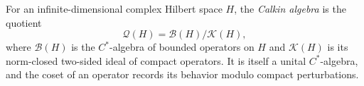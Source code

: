 
For an infinite-dimensional complex Hilbert space $H$, the \emph{Calkin algebra} is the quotient
\[
\mathcal Q(H)=\mathcal B(H)/\mathcal K(H),
\]
where $\mathcal B(H)$ is the $C^*$-algebra of bounded operators on $H$ and $\mathcal K(H)$ is its norm-closed two-sided ideal of compact operators. It is itself a unital $C^*$-algebra, and the coset of an operator records its behavior modulo compact perturbations.
